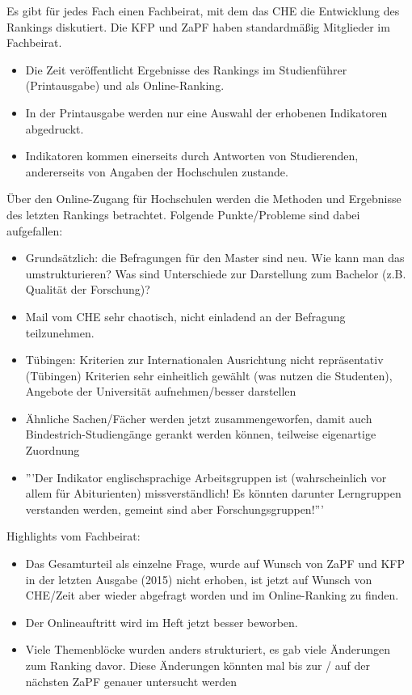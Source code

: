       Es gibt für jedes Fach einen Fachbeirat, mit dem das CHE die Entwicklung des Rankings diskutiert. Die KFP und ZaPF haben standardmäßig Mitglieder im Fachbeirat.
      \begin{itemize}
        \item Die Zeit veröffentlicht Ergebnisse des Rankings im Studienführer (Printausgabe) und als Online-Ranking.
        \item In der Printausgabe werden nur eine Auswahl der erhobenen Indikatoren abgedruckt.
        \item Indikatoren kommen einerseits durch Antworten von Studierenden, andererseits von Angaben der Hochschulen zustande.
      \end{itemize}

      Über den Online-Zugang für Hochschulen werden die Methoden und Ergebnisse des letzten Rankings betrachtet. Folgende Punkte/Probleme sind dabei aufgefallen:
      \begin{itemize}
        \item Grundsätzlich: die Befragungen für den Master sind neu. Wie kann man das umstrukturieren? Was sind Unterschiede zur Darstellung zum Bachelor (z.B. Qualität der Forschung)?
        \item Mail vom CHE sehr chaotisch, nicht einladend an der Befragung teilzunehmen.
        \item Tübingen: Kriterien zur Internationalen Ausrichtung nicht repräsentativ (Tübingen) Kriterien sehr einheitlich gewählt (was nutzen die Studenten), Angebote der Universität aufnehmen/besser darstellen
        \item Ähnliche Sachen/Fächer werden jetzt zusammengeworfen, damit auch Bindestrich-Studiengänge gerankt werden können, teilweise eigenartige Zuordnung
        \item '''Der Indikator englischsprachige Arbeitsgruppen ist (wahrscheinlich vor allem für Abiturienten) missverständlich! Es könnten darunter Lerngruppen verstanden werden, gemeint sind aber Forschungsgruppen!'''

      \end{itemize}

      Highlights vom Fachbeirat:
      \begin{itemize}
        \item Das Gesamturteil als einzelne Frage, wurde auf Wunsch von ZaPF und KFP in der letzten Ausgabe (2015) nicht erhoben, ist jetzt auf Wunsch von CHE/Zeit aber wieder abgefragt worden und im Online-Ranking zu finden.
        \item Der Onlineauftritt wird im Heft jetzt besser beworben.
        \item Viele Themenblöcke wurden anders strukturiert, es gab viele Änderungen zum Ranking davor. Diese Änderungen könnten mal bis zur / auf der nächsten ZaPF genauer untersucht werden
      \end{itemize}

